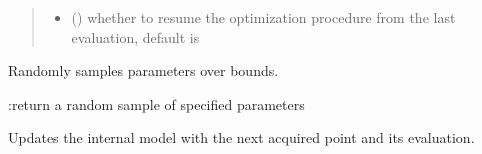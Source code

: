 \documentclass[letterpaper,10pt,english]{sphinxmanual}
\begin{document}
\begin{fulllineitems}
\begin{fulllineitems}
\begin{quote}
\begin{description}
\begin{itemize}
\item {} 
 () \textendash{} whether to resume the optimization procedure from the last evaluation, default is 

\end{itemize}

\end{description}\end{quote}

\end{fulllineitems}


\begin{fulllineitems}
\label{\detokenize{index:bo.bo.BO.sample_param}}
Randomly samples parameters over bounds.

:return a random sample of specified parameters

\end{fulllineitems}


\begin{fulllineitems}
\label{\detokenize{index:bo.bo.BO.update_gp}}
Updates the internal model with the next acquired point and its evaluation.

\end{fulllineitems}


\end{fulllineitems}

\label{\detokenize{index:module-bo.covfunc}}
\end{document}
